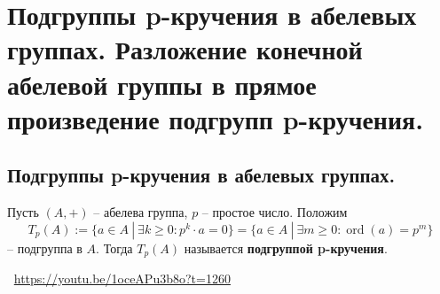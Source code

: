 \section{Подгруппы p-кручения в абелевых группах. Разложение конечной абелевой группы в прямое произведение подгрупп p-кручения.}

\subsection{Подгруппы p-кручения в абелевых группах.}
\begin{definition}
    Пусть $(A, +)$ -- абелева группа, $p$ -- простое число. Положим
    \[
        T_p(A) := \{ a \in A \> | \> \exists k \geqslant 0 : p^k \cdot a = 0 \} =
        \{ a \in A \> | \> \exists m \geqslant 0 : \operatorname{ord}(a) = p^m \}
    \] -- подгруппа в $A$. Тогда $T_p(A)$ называется \textbf{подгруппой p-кручения}.
\end{definition}
\large \faYoutube \normalsize $\>$ \url{https://youtu.be/1oceAPu3b8o?t=1260}

